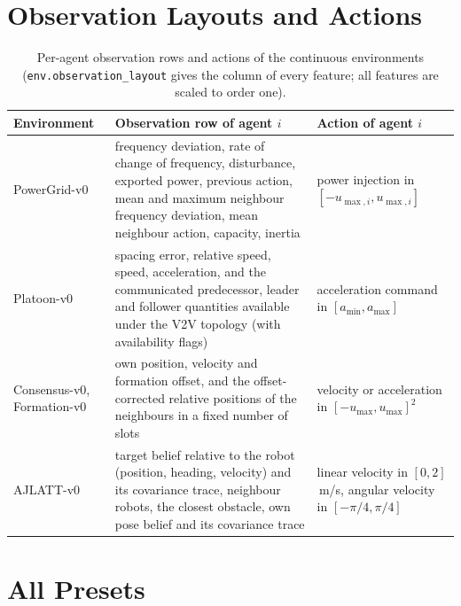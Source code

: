 \documentclass{article}
\newcommand{\code}[1]{\texttt{#1}}
\begin{document}



\newpage
\appendix
\onecolumn
\section{Observation Layouts and Actions}\label{app:layouts}

\begin{table}[h]
  \caption{Per-agent observation rows and actions of the continuous
    environments (\code{env.observation\_layout} gives the column of every
    feature; all features are scaled to order one).}
  \label{tab:layouts}
  \centering\small
  \begin{tabular}{@{}>{\raggedright}p{2.6cm}>{\raggedright}p{9.1cm}>{\raggedright\arraybackslash}p{4.4cm}@{}}
    \toprule
    Environment & Observation row of agent $i$ & Action of agent $i$ \\
    \midrule
    PowerGrid-v0 & frequency deviation, rate of change of frequency, disturbance,
      exported power, previous action, mean and maximum neighbour frequency
      deviation, mean neighbour action, capacity, inertia &
      power injection in $[-u_{\max,i}, u_{\max,i}]$ \\
    Platoon-v0 & spacing error, relative speed, speed, acceleration, and the
      communicated predecessor, leader and follower quantities available under
      the V2V topology (with availability flags) &
      acceleration command in $[a_{\min}, a_{\max}]$ \\
    Consensus-v0, Formation-v0 & own position, velocity and formation offset,
      and the offset-corrected relative positions of the neighbours in a fixed
      number of slots & velocity or acceleration in $[-u_{\max}, u_{\max}]^2$ \\
    AJLATT-v0 & target belief relative to the robot (position, heading,
      velocity) and its covariance trace, neighbour robots, the closest
      obstacle, own pose belief and its covariance trace &
      linear velocity in $[0, 2]$\,m/s, angular velocity in $[-\pi/4, \pi/4]$ \\
    \bottomrule
  \end{tabular}
\end{table}

\section{All Presets}\label{app:presets}
\end{document}
